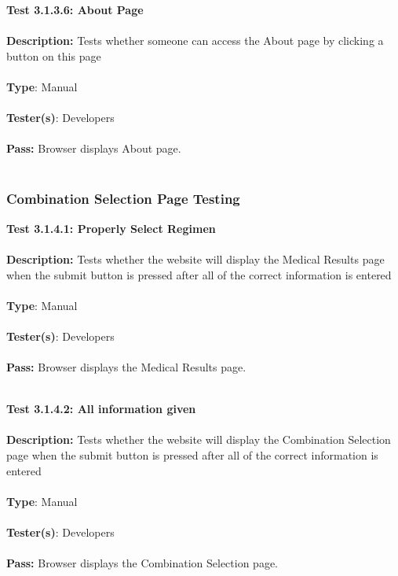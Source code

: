 \documentclass[12pt]{article}
\begin{document}
\begin{tcolorbox}
\textbf{Test 3.1.3.6: About Page} \\ \\
\textbf{Description:} Tests whether someone can access the About page by clicking a button on this page\\ \\
\textbf{Type}:  Manual\\ \\
\textbf{Tester(s)}:  Developers\\ \\
\textbf{Pass:}  Browser displays About page.\\ \\
\end{tcolorbox}

\subsubsection{Combination Selection Page Testing}
\begin{tcolorbox}
\textbf{Test 3.1.4.1: Properly Select Regimen} \\ \\
\textbf{Description:} Tests whether the website will display the Medical Results page when the submit button is pressed after all of the correct information is entered\\ \\
\textbf{Type}:  Manual\\ \\
\textbf{Tester(s)}:  Developers\\ \\
\textbf{Pass:}  Browser displays the Medical Results page.\\ \\
\end{tcolorbox}

\begin{tcolorbox}
\textbf{Test 3.1.4.2: All information given} \\ \\
\textbf{Description:} Tests whether the website will display the Combination Selection page when the submit button is pressed after all of the correct information is entered \\ \\
\textbf{Type}:  Manual\\ \\
\textbf{Tester(s)}:  Developers\\ \\
\textbf{Pass:} Browser displays the Combination Selection page.\\ \\
\end{tcolorbox}
\end{document}
